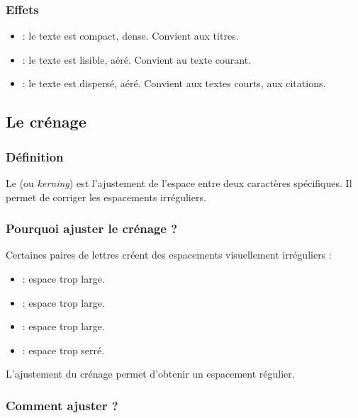 \subsubsection{Effets}

\begin{itemize}
    \item {} : le texte est compact, dense. Convient aux titres.
    \item {} : le texte est lisible, aéré. Convient au texte courant.
    \item {} : le texte est dispersé, aéré. Convient aux textes courts, aux citations.
\end{itemize}

\subsection{Le crénage}

\subsubsection{Définition}

Le  (ou \emph{kerning}) est l'ajustement de l'espace entre deux caractères spécifiques. Il permet de corriger les espacements irréguliers.

\subsubsection{Pourquoi ajuster le crénage ?}

Certaines paires de lettres créent des espacements visuellement irréguliers :

\begin{itemize}
    \item {} : espace trop large.
    \item {} : espace trop large.
    \item {} : espace trop large.
    \item {} : espace trop serré.
\end{itemize}

L'ajustement du crénage permet d'obtenir un espacement régulier.

\subsubsection{Comment ajuster ?}

